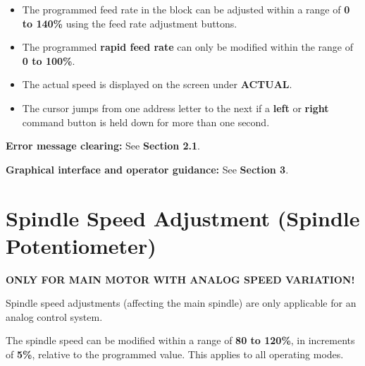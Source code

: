 \newpage

\notes

\begin{itemize}
    \item The programmed feed rate in the block can be adjusted within a range of \textbf{0 to 140\%} using the feed rate adjustment buttons.
    \item The programmed \textbf{rapid feed rate} can only be modified within the range of \textbf{0 to 100\%}.
    \item The actual speed is displayed on the screen under \textbf{ACTUAL}.
    \item The cursor jumps from one address letter to the next if a \textbf{left} or \textbf{right} command button is held down for more than one second.
\end{itemize}

\textbf{Error message clearing:} See \textbf{Section 2.1}.

\textbf{Graphical interface and operator guidance:} See \textbf{Section 3}.

\section{Spindle Speed Adjustment (Spindle Potentiometer)}

\textbf{ONLY FOR MAIN MOTOR WITH ANALOG SPEED VARIATION!}

Spindle speed adjustments (affecting the main spindle) are only applicable for an analog control system.

The spindle speed can be modified within a range of \textbf{80 to 120\%}, in increments of \textbf{5\%}, relative to the programmed value. This applies to all operating modes.


\begin{itemize}
\end{itemize}

\begin{itemize}
\end{itemize}

\begin{itemize}
\end{itemize}

